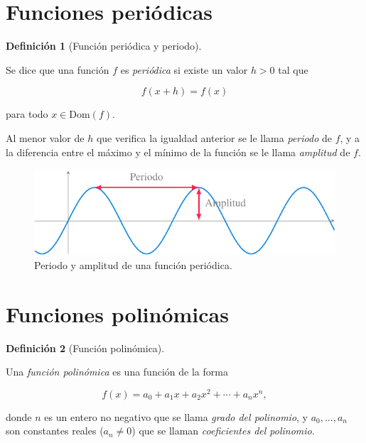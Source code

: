 \documentclass[
  a4paper,
]{scrreport}
\theoremstyle{definition}
\theoremstyle{plain}
\theoremstyle{definition}
\newtheorem{definition}{Definición}[chapter]
\theoremstyle{definition}
\theoremstyle{plain}
\theoremstyle{plain}
\theoremstyle{remark}
\begin{document}
\section{Funciones periódicas}\label{funciones-periuxf3dicas}

\begin{definition}[Función periódica y
periodo]\protect\hypertarget{def-funcion-periodica}{}\label{def-funcion-periodica}

Se dice que una función \(f\) es \emph{periódica} si existe un valor
\(h>0\) tal que

\[f(x+h)=f(x)\]

para todo \(x\in \mbox{Dom}(f)\).

Al menor valor de \(h\) que verifica la igualdad anterior se le llama
\emph{periodo} de \(f\), y a la diferencia entre el máximo y el mínimo
de la función se le llama \emph{amplitud} de \(f\).

\end{definition}

\begin{figure}[H]

{\centering \includegraphics[width=6.25in,height=\textheight]{./img/funciones/funcion-periodica.pdf}

}

\caption{Periodo y amplitud de una función periódica.}

\end{figure}%

\section{Funciones polinómicas}\label{funciones-polinuxf3micas}

\begin{definition}[Función
polinómica]\protect\hypertarget{def-funcion-polinomica}{}\label{def-funcion-polinomica}

Una \emph{función polinómica} es una función de la forma

\[f(x)=a_0+a_1x+a_2x^2+\cdots+a_nx^n,\]

donde \(n\) es un entero no negativo que se llama \emph{grado del
polinomio}, y \(a_0,\ldots,a_n\) son constantes reales (\(a_n\neq 0\))
que se llaman \emph{coeficientes del polinomio}.

\end{definition}
\end{document}
